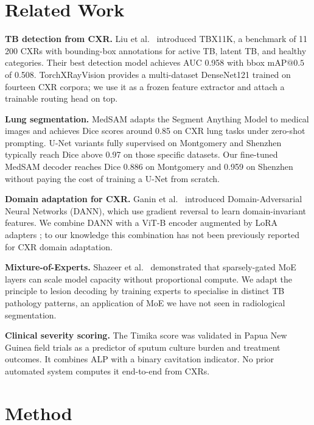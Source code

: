 \documentclass{article}
\begin{document}
\section{Related Work}

\textbf{TB detection from CXR.} Liu et al.\ \cite{liu2020tbx11k} introduced TBX11K, a benchmark of 11\,200 CXRs with bounding-box annotations for active TB, latent TB, and healthy categories. Their best detection model achieves AUC 0.958 with bbox $\text{mAP}@0.5$ of 0.508. TorchXRayVision \cite{cohen2022torchxrayvision} provides a multi-dataset DenseNet121 \cite{huang2017densenet} trained on fourteen CXR corpora; we use it as a frozen feature extractor and attach a trainable routing head on top.

\textbf{Lung segmentation.} MedSAM \cite{ma2024medsam} adapts the Segment Anything Model \cite{kirillov2023sam} to medical images and achieves Dice scores around 0.85 on CXR lung tasks under zero-shot prompting. U-Net variants \cite{ronneberger2015unet} fully supervised on Montgomery and Shenzhen typically reach Dice above 0.97 on those specific datasets. Our fine-tuned MedSAM decoder reaches Dice 0.886 on Montgomery and 0.959 on Shenzhen without paying the cost of training a U-Net from scratch.

\textbf{Domain adaptation for CXR.} Ganin et al.\ \cite{ganin2016domain} introduced Domain-Adversarial Neural Networks (DANN), which use gradient reversal to learn domain-invariant features. We combine DANN with a ViT-B encoder \cite{dosovitskiy2021vit} augmented by LoRA adapters \cite{hu2022lora}; to our knowledge this combination has not been previously reported for CXR domain adaptation.

\textbf{Mixture-of-Experts.} Shazeer et al.\ \cite{fedorov2017switch} demonstrated that sparsely-gated MoE layers can scale model capacity without proportional compute. We adapt the principle to lesion decoding by training experts to specialise in distinct TB pathology patterns, an application of MoE we have not seen in radiological segmentation.

\textbf{Clinical severity scoring.} The Timika score \cite{ralph2013timika} was validated in Papua New Guinea field trials as a predictor of sputum culture burden and treatment outcomes. It combines ALP with a binary cavitation indicator. No prior automated system computes it end-to-end from CXRs.

\section{Method}
\end{document}

